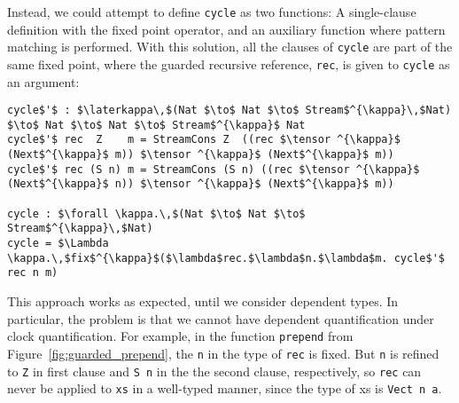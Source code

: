 Instead, we could attempt to define \texttt{cycle} as two functions: A
single-clause definition with the fixed point operator, and an auxiliary
function where pattern matching is performed. With this solution, all the clauses of
\texttt{cycle} are part of the same fixed point, where the guarded recursive reference,
\texttt{rec}, is given to \texttt{cycle} as an argument:

\begin{lstlisting}[mathescape, title=\ttBlock]
cycle$'$ : $\laterkappa\,$(Nat $\to$ Nat $\to$ Stream$^{\kappa}\,$Nat) $\to$ Nat $\to$ Nat $\to$ Stream$^{\kappa}$ Nat
cycle$'$ rec  Z    m = StreamCons Z  ((rec $\tensor ^{\kappa}$ (Next$^{\kappa}$ m)) $\tensor ^{\kappa}$ (Next$^{\kappa}$ m))
cycle$'$ rec (S n) m = StreamCons (S n) ((rec $\tensor ^{\kappa}$ (Next$^{\kappa}$ n)) $\tensor ^{\kappa}$ (Next$^{\kappa}$ m))

cycle : $\forall \kappa.\,$(Nat $\to$ Nat $\to$ Stream$^{\kappa}\,$Nat)
cycle = $\Lambda \kappa.\,$fix$^{\kappa}$($\lambda$rec.$\lambda$n.$\lambda$m. cycle$'$ rec n m)
\end{lstlisting}



This approach works as expected, until we consider dependent types. In
particular, the problem is that we cannot have dependent quantification under
clock quantification. For example, in the function \texttt{prepend} from
Figure~\ref{fig:guarded_prepend}, the \texttt{n} in the type of \texttt{rec} is
fixed. But \texttt{n} is refined to \texttt{Z} in first clause and \texttt{S n}
in the the second clause, respectively, so \texttt{rec} can never be applied to
\texttt{xs} in a well-typed manner, since the type of xs is \texttt{Vect n a}.


